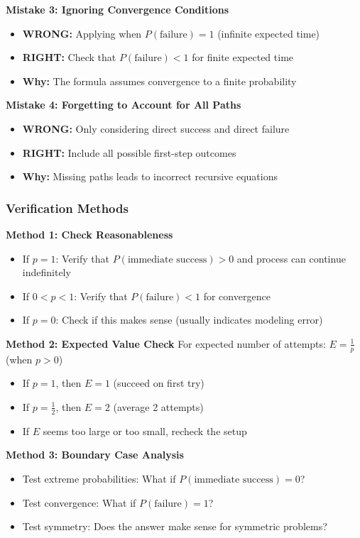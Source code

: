 \documentclass[12pt]{article}
\begin{document}
\textbf{Mistake 3: Ignoring Convergence Conditions}
\begin{itemize}
    \item \textbf{WRONG:} Applying when $P(\text{failure}) = 1$ (infinite expected time)
    \item \textbf{RIGHT:} Check that $P(\text{failure}) < 1$ for finite expected time
    \item \textbf{Why:} The formula assumes convergence to a finite probability
\end{itemize}

\textbf{Mistake 4: Forgetting to Account for All Paths}
\begin{itemize}
    \item \textbf{WRONG:} Only considering direct success and direct failure
    \item \textbf{RIGHT:} Include all possible first-step outcomes
    \item \textbf{Why:} Missing paths leads to incorrect recursive equations
\end{itemize}

\subsubsection{Verification Methods}

\textbf{Method 1: Check Reasonableness}
\begin{itemize}
    \item If $p = 1$: Verify that $P(\text{immediate success}) > 0$ and process can continue indefinitely
    \item If $0 < p < 1$: Verify that $P(\text{failure}) < 1$ for convergence
    \item If $p = 0$: Check if this makes sense (usually indicates modeling error)
\end{itemize}

\textbf{Method 2: Expected Value Check}
For expected number of attempts: $E = \frac{1}{p}$ (when $p > 0$)
\begin{itemize}
    \item If $p = 1$, then $E = 1$ (succeed on first try)
    \item If $p = \frac{1}{2}$, then $E = 2$ (average 2 attempts)
    \item If $E$ seems too large or too small, recheck the setup
\end{itemize}

\textbf{Method 3: Boundary Case Analysis}
\begin{itemize}
    \item Test extreme probabilities: What if $P(\text{immediate success}) = 0$?
    \item Test convergence: What if $P(\text{failure}) = 1$?
    \item Test symmetry: Does the answer make sense for symmetric problems?
\end{itemize}
\end{document}
